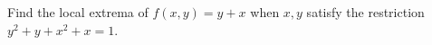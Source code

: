 \label{problemFindExtremay+xUnderRestrictiony^2+y+x^2+x=1} Find the local extrema of $f(x,y)=y+x$ when $x,y$ satisfy the restriction $y^2+y+x^2+x=1$.

